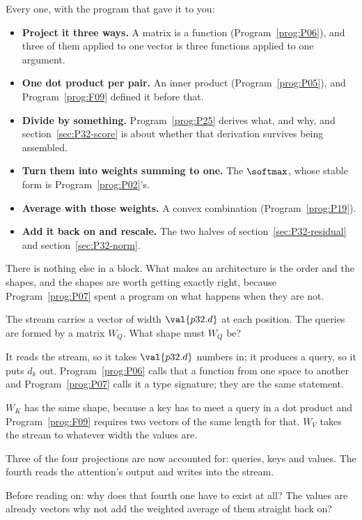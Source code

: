 \begin{fr}

Every one, with the program that gave it to you:

\begin{itemize}
\item \textbf{Project it three ways.} A matrix is a function
  (Program~\ref{prog:P06}), and three of them applied to one vector is three
  functions applied to one argument.
\item \textbf{One dot product per pair.} An inner product
  (Program~\ref{prog:P05}), and Program~\ref{prog:F09} defined it before
  that.
\item \textbf{Divide by something.} Program~\ref{prog:P25} derives what,
  and why, and section~\ref{sec:P32-score} is about whether that derivation
  survives being assembled.
\item \textbf{Turn them into weights summing to one.} The $\softmax$, whose
  stable form is Program~\ref{prog:P02}'s.
\item \textbf{Average with those weights.} A convex combination
  (Program~\ref{prog:P19}).
\item \textbf{Add it back on and rescale.} The two halves of
  section~\ref{sec:P32-residual} and section~\ref{sec:P32-norm}.
\end{itemize}

There is nothing else in a block. What makes an architecture is the order
and the shapes, and the shapes are worth getting exactly right, because
Program~\ref{prog:P07} spent a program on what happens when they are not.

The stream carries a vector of width $\val{p32.d}$ at each position. The
queries are formed by a matrix $W_Q$. What shape must $W_Q$ be?
\dotline
\nextframe
\end{fr}

\begin{fr}

It reads the stream, so it takes $\val{p32.d}$ numbers in; it produces a
query, so it puts $d_k$ out. Program~\ref{prog:P06} calls that a function
from one space to another and Program~\ref{prog:P07} calls it a type
signature; they are the same statement.

$W_K$ has the same shape, because a key has to meet a query in a dot
product and Program~\ref{prog:F09} requires two vectors of the same length
for that. $W_V$ takes the stream to whatever width the values are.

Three of the four projections are now accounted for: queries, keys and
values. The fourth reads the attention's output and writes into the stream.

Before reading on: why does that fourth one have to exist at all? The values
are already vectors \dash{} why not add the weighted average of them
straight back on?
\dotline
\nextframe
\end{fr}

